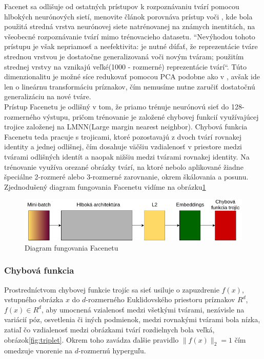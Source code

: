 \indent Facenet sa odlišuje od ostatných prístupov k rozpoznávaniu tvárí pomocou hlbokých neurónových sietí, menovite článok \cite{schroff2015facenet} porovnáva prístup voči \cite{wst2008deeply}, kde bola použitá stredná vrstva neurónovej siete natrénovanej na známych inentitách, na všeobecné rozpoznávanie tvárí mimo trénovacieho datasetu.
``Nevýhodou tohoto prístupu je však nepriamosť a neefektivita: je nutné dúfať, že reprezentácie tváre strednou vrstvou je dostatočne generalizovaná voči novým tváram; použitím strednej vrstvy na vznikajú veľké(1000 - rozmerné) reprezentácie tvárí``\cite{schroff2015facenet}. 
Túto dimenzionalitu je možné síce redukovať pomocou PCA podobne ako v \cite{wst2008deeply}, avšak ide len o lineárnu transformáciu príznakov, čím nemusíme nutne zaručiť dostatočnú generalizáciu na nové tváre. \\

\indent Prístup Facenetu je odlišný v tom, že priamo trénuje neurónovú sieť do 128-rozmerného výstupu, pričom trénovanie je založené chybovej funkcií využívajúcej trojice založenej na LMNN(Large margin nearest neighbor)\cite{weinberger2009distance}.
Chybová funkcia Facenetu teda pracuje s trojicami, ktoré pozostavajú z dvoch tvárí rovnakej identity a jednej odlišnej, čím dosahuje väčšiu vzdialenosť v priestore medzi tvárami odlišných identít a naopak nižšiu medzi tvárami rovnakej identity.
Na trénovanie využíva orezané obrázky tvárí, na ktoré nebolo aplikované žiadne špeciálne 2-rozmeré alebo 3-rozmerné zarovnanie, okrem škálovania a posunu. \\

\indent Zjednodušený diagram fungovania Facenetu vidíme na obrázku\ref{fig:facenet}

\begin{figure}[H]
	\centering
	\includegraphics[width=1\linewidth]{img/facenet}
	\caption{Diagram fungovania Facenetu}
	\label{fig:facenet}
\end{figure}

\subsubsection{Chybová funkcia}
Prostredníctvom chybovej funkcie trojíc sa sieť usiluje o zapuzdrenie $f(x)$, vstupného obrázka $x$ do $d$-rozmerného Euklidovského priestoru príznakov $R^d$, $f(x) \in R^d$, aby umocnená vzialenosť medzi všetkými tvárami, nezávisle na variácií póz, osvetlenia či iných podmienok, medzi rovnakými tvárami bola nízka, zatiaľ čo vzdialenosť medzi obrázkami tvárí rozdielnych bola veľká, obrázok\ref{fig:triplet}\cite{schroff2015facenet}.
Okrem toho zavádza ďalšie pravidlo $\parallel f(x) \parallel_{2} = 1$ čím omedzuje vnorenie na 
$d$-rozmernú hyperguľu.

